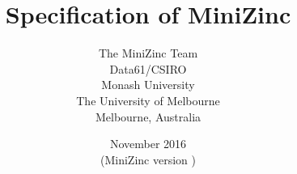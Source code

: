 \documentclass[10pt]{scrartcl}
\title{\textbf{Specification of MiniZinc}}
\author{The MiniZinc Team\\[2ex]
Data61/CSIRO\\
Monash University\\
The University of Melbourne\\
Melbourne, Australia}
\date{November 2016\\
{\small (MiniZinc version \mznversion)}}
\begin{document}
\maketitle
\thispagestyle{empty}


\newcommand{\RuleModel}{
\production{model}
    \maybe{\semicolons{\nt{item}}}
}
\newcommand{\RuleItem}{
\production{item}
\nt{include-item}
\alt\nt{var-decl-item}
\alt\nt{assign-item}
\alt\nt{constraint-item}
\alt\nt{solve-item}
\alt\nt{output-item}
\alt\nt{predicate-item}
\alt\nt{test-item}
\alt\nt{function-item}
\alt\nt{annotation-item}
}

\newcommand{\RuleTypeInstSynItem}{
\production{type-inst-syn-item}
    \term{type} \nt{ident} \nt{annotations} \term{=} \nt{ti-expr}
}

\newcommand{\RuleEnumItem}{
\production{enum-item}
    \term{enum} \nt{ident} \nt{annotations} \maybe{\term{=} \nt{enum-cases}}
}
\newcommand{\RuleEnumCases}{
\production{enum-cases}
    \curlies{\commas{\nt{ident}}}
}

\newcommand{\RuleIncludeItem}{
\production{include-item}
    \term{include} \nt{string-literal}
}

\newcommand{\RuleVarDeclItem}{
\production{var-decl-item}
    \nt{ti-expr-and-id} \nt{annotations}
        \maybe{\term{=} \nt{expr}}
}

\newcommand{\RuleAssignItem}{
\production{assign-item}
    \nt{ident} \term{=} \nt{expr}
}

\newcommand{\RuleConstraintItem}{
\production{constraint-item}
    \term{constraint} \nt{expr}
}

\newcommand{\RuleSolveItem}{
\production{solve-item}
    \term{solve} \nt{annotations} \term{satisfy}
\alt\term{solve} \nt{annotations} \term{minimize} \nt{expr}
\alt\term{solve} \nt{annotations} \term{maximize} \nt{expr}
}
\end{document}
